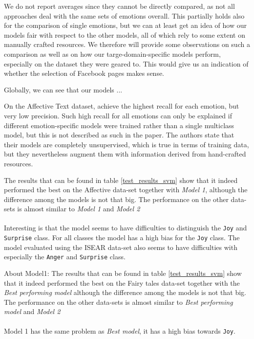 \documentclass[11pt]{article}
\begin{document}
\bigskip

\noindent 
We do not report averages since they cannot be directly compared, as not all approaches deal with the same sets of emotions overall. This partially holds also for the comparison of single emotions, but we can at least get an idea of how our models fair with respect to the other models, all of which rely to some extent on manually crafted resources. We therefore will provide some observations on such a comparison as well as on how our targe-domain-specific models perform, especially on the dataset they were geared to. This would give us an indication of whether the selection of Facebook pages makes sense.

Globally, we can see that our models ...

On the Affective Text dataset,  achieve the highest recall for each emotion, but very low precision. Such high recall for all emotions can only be explained if different emotion-specific models were trained rather than a single multiclass model, but this is not described as such in the paper. The authors state that their models are completely unsupervised, which is true in terms of training data, but they nevertheless augment them with information derived from hand-crafted resources.




The results that can be found in table \ref{test_results_svm} show that it indeed performed the best on the Affective data-set together with \textit{Model 1}, although the difference among the models is not that big. The performance on the other data-sets is almost similar to  \textit{Model 1} and \textit{Model 2}\\\\
Interesting is that the model seems to have difficulties to distinguish the \texttt{Joy} and \texttt{Surprise} class. For all classes the model has a high bias for the \texttt{Joy} class. The model evaluated using the ISEAR data-set also seems to have difficulties with especially the \texttt{Anger} and \texttt{Surprise} class.


About Model1: The results that can be found in table \ref{test_results_svm} show that it indeed performed the best on the Fairy tales data-set together with the \textit{Best performing model} although the difference among the models is not that big. The performance on the other data-sets is almost similar to  \textit{Best performing model} and \textit{Model 2}\\\\
Model 1 has the same problem as \textit{Best model}, it has a high bias towards \texttt{Joy}.
\end{document}
